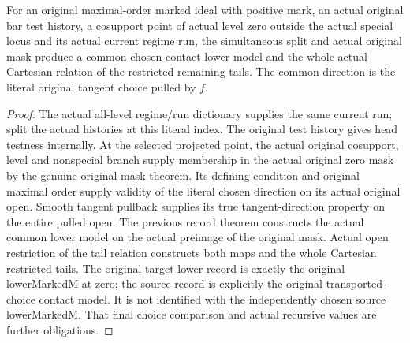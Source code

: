 \begin{theorem}
\label{hir:smooth-original-contact-actual-selected-zero-diagram}
\leanok
{}
For an original maximal-order marked ideal with positive mark, an actual
original bar test history, a cosupport point of actual level zero outside
the actual special locus and its actual current regime run, the simultaneous
split and actual original mask produce a common chosen-contact lower model
and the whole actual Cartesian relation of the restricted remaining tails.
The common direction is the literal original tangent choice pulled by $f$.
\end{theorem}
\begin{proof}
The actual all-level regime/run dictionary supplies the same current run;
split the actual histories at this literal index. The original test
history gives head testness internally. At the selected projected point,
the actual original cosupport, level and nonspecial branch supply membership
in the actual original zero mask by the genuine original mask theorem.
Its defining condition and original maximal order supply validity of the
literal chosen direction on its actual original open. Smooth tangent
pullback supplies its true tangent-direction property on the entire pulled
open. The previous record theorem constructs the actual common lower model
on the actual preimage of the original mask. Actual open restriction of the
tail relation constructs both maps and the whole Cartesian restricted tails.
The original target lower record is exactly the original lowerMarkedM at
zero; the source record is explicitly the original transported-choice
contact model. It is not identified with the independently chosen source
lowerMarkedM. That final choice comparison and actual recursive values are
further obligations.
\end{proof}

